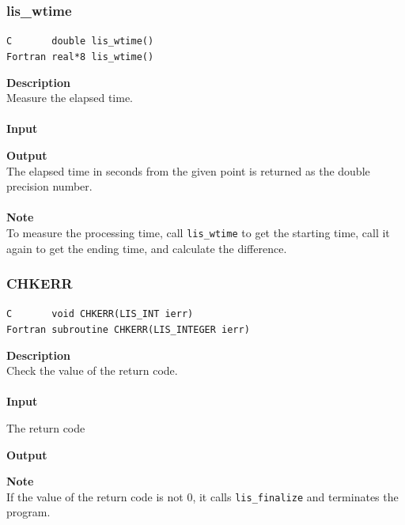 \documentclass[a4paper]{article}
\newcommand{\namelistlabel}[1]{\mbox{#1}\hfill}
\newenvironment{namelist}[1]{%
\begin{list}{}
  {\let\makelabel\namelistlabel
  \settowidth{\labelwidth}{#1}
  \setlength{\leftmargin}{1.1\labelwidth}}
  }{%
\end{list}}
\begin{document}
\subsubsection{lis\_wtime}
\begin{screen}
\verb|C       double lis_wtime()|\\
\verb|Fortran real*8 lis_wtime()|
\end{screen}
{\bf Description}\\
\indent
Measure the elapsed time. 
\\ \\
\noindent
{\bf Input}
\begin{namelist}{XXXXXXXXXXXXXXXXXXXX}
\item[None]
\end{namelist}
{\bf Output}\\
\indent
The elapsed time in seconds from the given point is returned as the
double precision number.
\\ \\
\noindent
{\bf Note}\\
\indent
To measure the processing time, call \verb|lis_wtime| to get
the starting time, call it again to get the ending time, 
and calculate the difference. 

\subsubsection{CHKERR}
\begin{screen}
\verb|C       void CHKERR(LIS_INT ierr)|\\
\verb|Fortran subroutine CHKERR(LIS_INTEGER ierr)|
\end{screen}
{\bf Description}\\
\indent
Check the value of the return code. 
\\ \\
\noindent
{\bf Input}
\begin{namelist}{XXXXXXXXXXXXXXXXXXXX}
\item[\tt ierr] The return code
\end{namelist}
{\bf Output}
\begin{namelist}{XXXXXXXXXXXXXXXXXXXX}
\item[None] 
\end{namelist}
\noindent
{\bf Note}\\
\indent
If the value of the return code is not 0, it calls \verb|lis_finalize| 
and terminates the program. 

\newpage
\end{document}
